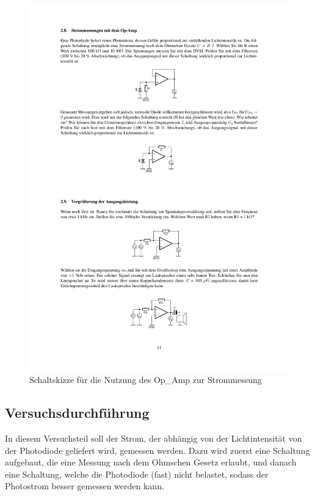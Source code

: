 \documentclass[12pt,a4paper]{article}
\begin{document}
\begin{figure}[H] 
  \centering
    \includegraphics[trim = 10mm 155mm 10mm 110mm, clip, scale = 1]{ep4_14[Page11].pdf}
  	\caption[Schaltskizze für die Nutzung des Op\_Amp zur Strommessung]{Schaltskizze für die Nutzung des Op\_Amp zur Strommessung\footnotemark}
  \label{fig:1}
\end{figure}

\subsection{Versuchsdurchführung}
In diesem Versuchsteil soll der Strom, der abhängig von der Lichtintensität von der Photodiode geliefert wird, gemessen werden. Dazu wird zuerst eine Schaltung aufgebaut, die eine Messung nach dem Ohmschen Gesetz erlaubt, und danach eine Schaltung, welche die Photodiode (fast) nicht belastet, sodass der Photostrom besser gemessen werden kann.
\end{document}
